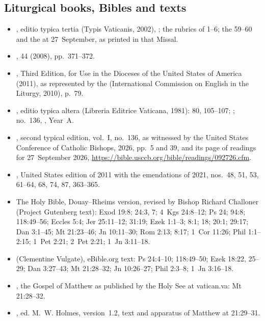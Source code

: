 {\small
\subsection*{Liturgical books, Bibles and texts}
\begin{itemize}[itemsep=0pt,topsep=.25em]
\item {}, editio typica tertia (Typis Vaticanis, 2002), ; the rubrics of  1--6; the  59--60 and the  at 27~September, as printed in that Missal.
\item {},  44 (2008), pp.~371--372.
\item {}, Third Edition, for Use in the Dioceses of the United States of America (2011), as represented by the  (International Commission on English in the Liturgy, 2010), p.~79.
\item {}, editio typica altera (Libreria Editrice Vaticana, 1981):  80, 105--107; ; no.~136, , Year~A.
\item {}, second typical edition, vol.~I, no.~136, as witnessed by the United States Conference of Catholic Bishops,  2026, pp.~5 and 39, and its page of readings for 27~September 2026, \url{https://bible.usccb.org/bible/readings/092726.cfm}.
\item {}, United States edition of 2011 with the emendations of 2021, nos.~48, 51, 53, 61--64, 68, 74, 87, 363--365.
\item The Holy Bible, Douay--Rheims version, revised by Bishop Richard Challoner (Project Gutenberg text): Exod 19:8; 24:3, 7; 4~Kgs 24:8--12; Ps 24; 94:8; 118:49--56; Eccles 5:4; Jer 25:11--12; 31:19; Ezek 1:1--3; 8:1; 18; 20:1; 29:17; Dan 3:1--45; Mt 21:23--46; Jn 10:11--30; Rom 2:13; 8:17; 1~Cor 11:26; Phil 1:1--2:15; 1~Pet 2:21; 2~Pet 2:21; 1~Jn 3:11--18.
\item {} (Clementine Vulgate), eBible.org text: Ps 24:4--10; 118:49--50; Ezek 18:22, 25--29; Dan 3:27--43; Mt 21:28--32; Jn 10:26--27; Phil 2:3--8; 1~Jn 3:16--18.
\item {}, the Gospel of Matthew as published by the Holy See at vatican.va: Mt 21:28--32.
\item {}, ed. M.~W. Holmes, version~1.2, text and apparatus of Matthew at 21:29--31.
\end{itemize}

}
